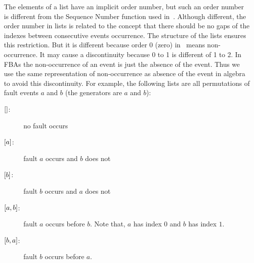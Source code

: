 The elements of a list have an implicit order number, but such an order number is different from the Sequence Number function used in~\cite{WP2009,Walker2009}.
Although different, the order number in lists is related to the concept that there should be no gaps of the indexes between consecutive events occurrence.
The structure of the lists ensures this restriction.
But it is different because order 0 (zero) in~\cite{WP2009,Walker2009} means non-occurrence.
It may cause a discontinuity because 0 to 1 is different of 1 to 2.
In \acp{FBA} the non-occurrence of an event is just the absence of the event.
Thus we use the same representation of non-occurrence as absence of the event in \ac{algebra} to avoid this discontinuity.
For example, the following lists are all permutations of fault events $a$ and $b$ (the generators are $a$ and $b$):
\begin{description}
	\item[$[] $: ] no fault occurs
	\item[$\left[ a \right]$: ] fault $a$ occurs and $b$ does not
	\item[$\left[ b \right]$: ] fault $b$ occurs and $a$ does not
	\item[$\left[ a,b \right]$: ] fault $a$ occurs before $b$. Note that, $a$ has index $0$ and $b$ has index $1$.
	\item[$\left[ b,a \right]$: ] fault $b$ occurs before $a$.
\end{description}






